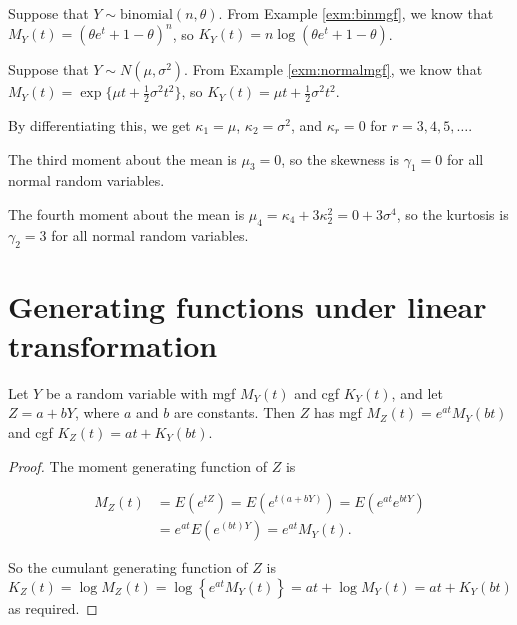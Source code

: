 \documentclass[]{book}
\theoremstyle{definition}
\theoremstyle{definition}
\theoremstyle{definition}
\theoremstyle{remark}
\let\BeginKnitrBlock\begin \let\EndKnitrBlock\end
\begin{document}
\BeginKnitrBlock{example}[Binomial cgf]
\protect\hypertarget{exm:unnamed-chunk-28}{}{\label{exm:unnamed-chunk-28}
\iffalse (Binomial cgf) \fi{} }Suppose that
\(Y \sim \text{binomial}(n, \theta)\). From Example \ref{exm:binmgf}, we
know that \(M_Y(t) = (\theta e^t + 1 - \theta)^n\), so
\(K_Y(t) = n \log(\theta e^t + 1 - \theta)\).
\EndKnitrBlock{example}

\BeginKnitrBlock{example}[Normal cgf]
\protect\hypertarget{exm:cgfnormal}{}{\label{exm:cgfnormal} \iffalse (Normal
cgf) \fi{} }Suppose that \(Y \sim N(\mu, \sigma^2)\). From Example
\ref{exm:normalmgf}, we know that
\(M_Y(t) = \exp\{\mu t + \frac{1}{2} \sigma^2 t^2\}\), so
\(K_Y(t) = \mu t + \frac{1}{2} \sigma^2 t^2\).

By differentiating this, we get \(\kappa_1 = \mu\),
\(\kappa_2 = \sigma^2\), and \(\kappa_r = 0\) for
\(r = 3, 4, 5, \ldots\).

The third moment about the mean is \(\mu_3 = 0\), so the skewness is
\(\gamma_1 = 0\) for all normal random variables.

The fourth moment about the mean is
\(\mu_4 = \kappa_4 + 3 \kappa_2^2 = 0 + 3 \sigma^4\), so the kurtosis is
\(\gamma_2 = 3\) for all normal random variables.
\EndKnitrBlock{example}

\section{Generating functions under linear
transformation}\label{generating-functions-under-linear-transformation}

\BeginKnitrBlock{theorem}
\protect\hypertarget{thm:gflinear}{}{\label{thm:gflinear} }Let \(Y\) be a
random variable with mgf \(M_Y(t)\) and cgf \(K_Y(t)\), and let
\(Z = a + bY\), where \(a\) and \(b\) are constants. Then \(Z\) has mgf
\(M_Z(t) = e^{at} M_Y(bt)\) and cgf \(K_Z(t) = at + K_Y(bt).\)
\EndKnitrBlock{theorem}

\BeginKnitrBlock{proof}
\iffalse{} {Proof. } \fi{}The moment generating function of \(Z\) is

\begin{align*}
M_Z(t) &= E(e^{tZ}) 
= E(e^{t (a + bY)})
= E(e^{at} e^{btY})\\
&= e^{at} E(e^{(bt)Y})
= e^{at} M_Y(t).
\end{align*}

So the cumulant generating function of \(Z\) is \[K_Z(t) = \log M_Z(t) 
= \log \left\{e^{at} M_Y(t)\right\}
= at + \log M_Y(t)
= at + K_Y(bt)\] as required.
\EndKnitrBlock{proof}
\end{document}
